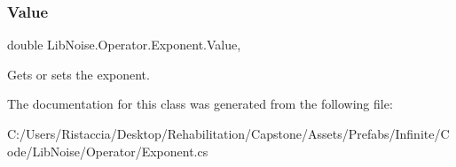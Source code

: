 \subsubsection{\texorpdfstring{Value}{Value}}
{\footnotesize\ttfamily double Lib\+Noise.\+Operator.\+Exponent.\+Value\hspace{0.3cm}{\ttfamily [get]}, {\ttfamily [set]}}



Gets or sets the exponent. 



The documentation for this class was generated from the following file\+:\begin{DoxyCompactItemize}
\item 
C\+:/\+Users/\+Ristaccia/\+Desktop/\+Rehabilitation/\+Capstone/\+Assets/\+Prefabs/\+Infinite/\+Code/\+Lib\+Noise/\+Operator/Exponent.\+cs\end{DoxyCompactItemize}
